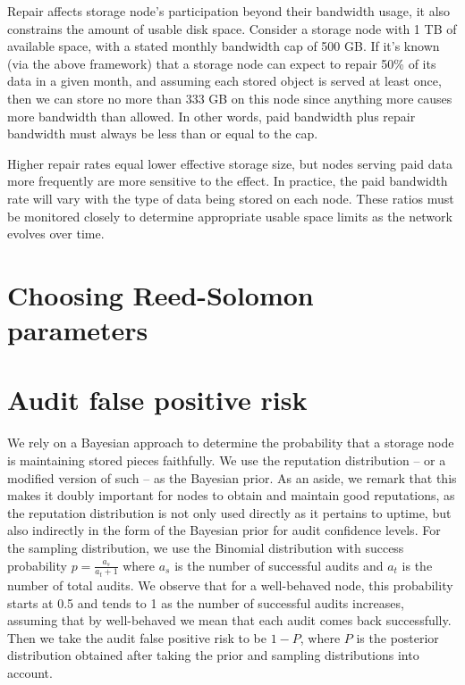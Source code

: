 \documentclass[11pt,fleqn,openany]{book}
\begin{document}
	Repair affects storage node's participation beyond their bandwidth usage, it also constrains the amount of usable disk space. Consider a storage node with 1 TB of available space, with a stated monthly bandwidth cap of 500 GB. If it's known (via the above framework) that a storage node can expect to repair 50\% of its data in a given month, and assuming each stored object is served at least once, then we can store no more than 333 GB on this node since anything more causes more bandwidth than allowed. In other words, paid bandwidth plus repair bandwidth must always be less than or equal to the cap.

    Higher repair rates equal lower effective storage size, but nodes serving paid data more frequently are more sensitive to the effect. In practice, the paid bandwidth rate will vary with the type of data being stored on each node. These ratios must be monitored closely to determine appropriate usable space limits as the network evolves over time.


\chapter{Choosing Reed-Solomon parameters}






\chapter{Audit false positive risk}\label{appendix:audit-false-positive}

We rely on a Bayesian approach to determine the probability
that a storage node is maintaining stored pieces faithfully.
We use the reputation distribution -- or a modified version of such --
as the Bayesian prior. As an aside, we remark that this makes it doubly important
for nodes to obtain and maintain good reputations,
as the reputation distribution is not only used directly as it pertains to uptime,
but also indirectly in the form of the Bayesian prior for audit confidence levels.
For the sampling distribution, we use the Binomial distribution with
success probability $p=\frac{a_s}{a_t+1}$ where $a_s$ is the number of
successful audits and $a_t$ is the number of total audits.
We observe that for a well-behaved node, this probability starts at 0.5
and tends to 1 as the number of successful audits increases,
assuming that by well-behaved we mean that each audit comes back successfully.
Then we take the audit false positive risk to be $1-P$,
where $P$ is the posterior distribution obtained after taking the
prior and sampling distributions into account.
\end{document}
